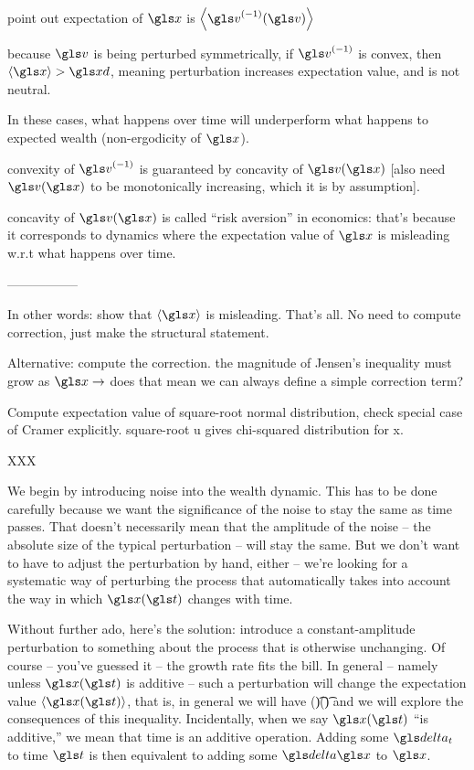 point out expectation of $\x$ is $\ave{\gv^{(-1)}(\gv)}$

because $\gv$ is being perturbed symmetrically, if $\gv^{(-1)}$ is convex, then $\ave{\x}>\xd$, meaning perturbation increases expectation value, and is not neutral.

In these cases, what happens over time will underperform what happens to expected wealth (non-ergodicity of $\x$).

convexity of $\gv^{(-1)}$ is guaranteed by concavity of $\gv(\x)$ [also need $\gv(\x)$ to be monotonically increasing, which it is by assumption].

concavity of $\gv(\x)$ is called ``risk aversion'' in economics: that's because it corresponds to dynamics where the expectation value of $\x$ is misleading w.r.t what happens over time.


-----------------

In other words: show that $\ave{\x}$ is misleading. That's all. No need to compute correction, just make the structural statement.

Alternative: compute the correction. the magnitude of Jensen's inequality must grow as $\x \to$ does that mean we can always define a simple correction term?

Compute expectation value of square-root normal distribution, \ie check special case of Cramer explicitly. square-root u gives chi-squared distribution for x.

XXX

We begin by introducing noise into the wealth dynamic. This has to be done carefully because we want the significance of the noise to stay the same as time passes. That doesn't necessarily mean that the amplitude of the noise -- the absolute size of the typical perturbation -- will stay the same. But we don't want to have to adjust the perturbation by hand, either -- we're looking for a systematic way of perturbing the process that automatically takes into account the way in which $\x(\t)$ changes with time. 


Without further ado, here's the solution: introduce a constant-amplitude perturbation to something about the process that is otherwise unchanging. Of course -- you've guessed it -- the growth rate fits the bill. In general -- namely unless $\x(\t)$ is additive -- such a perturbation will change the expectation value $\ave{\x(\t)}$, that is, in general we will have 
\be
\ave{\x}(\t)\neq \xd(\t)
\ee
and we will explore the consequences of this inequality. Incidentally, when we say $\x(\t)$ ``is additive,'' we mean that time is an additive operation. Adding some $\dt$ to time $\t$ is then equivalent to adding some $\d \x$ to $\x$.

